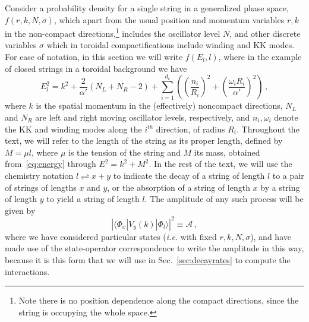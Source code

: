 \documentclass[a4paper,11pt]{article}
\newcommand{\lr}[1]{\left(#1\right)}
\begin{document}
Consider a probability density for a single string in a generalized phase space, $f(r,k,N,\sigma)$, which apart from the usual position and momentum variables $r,k$ in the non-compact directions,\footnote{Note there is no position dependence along the compact directions, since the string is occupying the whole space.} includes the oscillator level $N$, and other discrete variables $\sigma$ which in toroidal compactifications include winding and KK modes.
For ease of notation, in this section we will write $f(E_l,l)$, where in the example of closed strings in a toroidal background we have
\begin{equation}\label{eq:energy}
    E_l^2=k^2+\frac{2}{\alpha'}(N_L+N_R-2)+\sum_{i=1}^{d_c}\lr{{\lr{\frac{n_i}{R_i}}^2+\lr{\frac{\omega_iR_i}{\alpha'}}^2}}\, ,
\end{equation}
where $k$ is the spatial momentum in the (effectively) noncompact directions, $N_L$ and $N_R$ are left and right moving oscillator levels, respectively, and ${n_i,\omega_i}$ denote the KK and winding modes along the $i^{th}$ direction, of radius $R_i$.
Throughout the text, we will refer to the length of the string as its proper length, defined by $M=\mu l$, where $\mu$ is the tension of the string and $M$ its mass, obtained from~\eqref{eq:energy} through $E^2=k^2+M^2$. 
In the rest of the text, we will use the chemistry notation $l\rightleftharpoons x+y$ to indicate the decay of a string of length $l$ to a pair of strings of lengths $x$ and $y$, or the absorption of a string of length $x$ by a string of length $y$ to yield a string of length $l$. 
The amplitude of any such process will be given by 
\begin{equation}\label{eq: }
    |{\langle \Phi_{x} | V_y(k) | \Phi_{l}}\rangle |^2\equiv \mathcal{A} \, ,
\end{equation}
where we have considered particular states (\textit{i.e.} with fixed $r,k,N,\sigma$), and have made use of the state-operator correspondence to write the amplitude in this way, because it is this form that we will use in Sec.~\ref{sec:decayrates} to compute the interactions.
\end{document}
